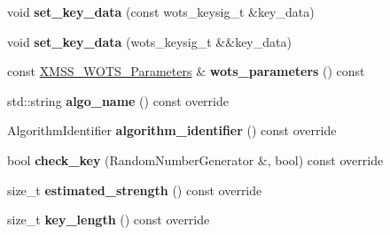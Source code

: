 \begin{DoxyCompactItemize}
\item 
\mbox{\label{class_botan_1_1_x_m_s_s___w_o_t_s___public_key_acc0a23af03f8f0769b7a607b68f6bd3b}} 
void {\bfseries set\+\_\+key\+\_\+data} (const wots\+\_\+keysig\+\_\+t \&key\+\_\+data)
\item 
\mbox{\label{class_botan_1_1_x_m_s_s___w_o_t_s___public_key_af638326b904101d67151f39d29a1a892}} 
void {\bfseries set\+\_\+key\+\_\+data} (wots\+\_\+keysig\+\_\+t \&\&key\+\_\+data)
\item 
\mbox{\label{class_botan_1_1_x_m_s_s___w_o_t_s___public_key_ad29785971c1dc7421c98b04013220836}} 
const \mbox{\hyperlink{class_botan_1_1_x_m_s_s___w_o_t_s___parameters}{X\+M\+S\+S\+\_\+\+W\+O\+T\+S\+\_\+\+Parameters}} \& {\bfseries wots\+\_\+parameters} () const
\item 
\mbox{\label{class_botan_1_1_x_m_s_s___w_o_t_s___public_key_aa712ab07c9c77f8468eacb066b16a8bb}} 
std\+::string {\bfseries algo\+\_\+name} () const override
\item 
\mbox{\label{class_botan_1_1_x_m_s_s___w_o_t_s___public_key_a9a0d689a30069a8f1875eb8fce3cda0e}} 
Algorithm\+Identifier {\bfseries algorithm\+\_\+identifier} () const override
\item 
\mbox{\label{class_botan_1_1_x_m_s_s___w_o_t_s___public_key_a9e700bca0fc8527fd85815371acfc6d2}} 
bool {\bfseries check\+\_\+key} (Random\+Number\+Generator \&, bool) const override
\item 
\mbox{\label{class_botan_1_1_x_m_s_s___w_o_t_s___public_key_a7aa41153ba1027d3f821c2803468b051}} 
size\+\_\+t {\bfseries estimated\+\_\+strength} () const override
\item 
\mbox{\label{class_botan_1_1_x_m_s_s___w_o_t_s___public_key_a73c7ca8dfd51b5d8f2506c7ed905fd56}} 
size\+\_\+t {\bfseries key\+\_\+length} () const override
\item 

\end{DoxyCompactItemize}
